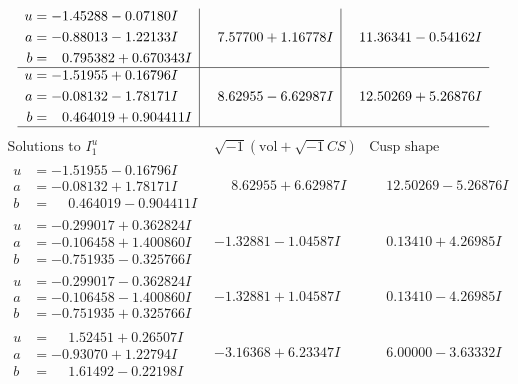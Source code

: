 \documentclass[1p]{elsarticle_modified}
\theoremstyle{definition}
\newcommand{\I}{\sqrt{-1}}
\begin{document}
$$\begin{array}{c|c|c}
\begin{aligned}
u &= -1.45288 - 0.07180 I \\
a &= -0.88013 - 1.22133 I \\
b &= \phantom{-}0.795382 + 0.670343 I\end{aligned}
 & \phantom{-}7.57700 + 1.16778 I & \phantom{-}11.36341 - 0.54162 I \\ \hline\begin{aligned}
u &= -1.51955 + 0.16796 I \\
a &= -0.08132 - 1.78171 I \\
b &= \phantom{-}0.464019 + 0.904411 I\end{aligned}
 & \phantom{-}8.62955 - 6.62987 I & \phantom{-}12.50269 + 5.26876 I\\
 \hline 
 \end{array}$$\newpage$$\begin{array}{c|c|c}  
\text{Solutions to }I^u_{1}& \I (\text{vol} + \sqrt{-1}CS) & \text{Cusp shape}\\
 \hline 
\begin{aligned}
u &= -1.51955 - 0.16796 I \\
a &= -0.08132 + 1.78171 I \\
b &= \phantom{-}0.464019 - 0.904411 I\end{aligned}
 & \phantom{-}8.62955 + 6.62987 I & \phantom{-}12.50269 - 5.26876 I \\ \hline\begin{aligned}
u &= -0.299017 + 0.362824 I \\
a &= -0.106458 + 1.400860 I \\
b &= -0.751935 - 0.325766 I\end{aligned}
 & -1.32881 - 1.04587 I & \phantom{-}0.13410 + 4.26985 I \\ \hline\begin{aligned}
u &= -0.299017 - 0.362824 I \\
a &= -0.106458 - 1.400860 I \\
b &= -0.751935 + 0.325766 I\end{aligned}
 & -1.32881 + 1.04587 I & \phantom{-}0.13410 - 4.26985 I \\ \hline\begin{aligned}
u &= \phantom{-}1.52451 + 0.26507 I \\
a &= -0.93070 + 1.22794 I \\
b &= \phantom{-}1.61492 - 0.22198 I\end{aligned}
 & -3.16368 + 6.23347 I & \phantom{-}6.00000 - 3.63332 I \\ \hline\begin{aligned}

\end{aligned}
\end{array}$$
\end{document}
